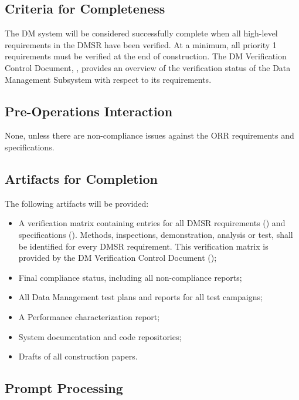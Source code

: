 \subsection{Criteria for Completeness} \label{sec:dm-completeness}
The DM system will be considered successfully complete when all high-level requirements in the DMSR have been verified. 
At a minimum, all priority 1 requirements must be verified at the end of construction.
The DM Verification Control Document, ,  provides an overview of the verification status of the Data Management Subsystem with respect to its requirements.

\subsection{Pre-Operations Interaction}
None, unless there are non-compliance issues against the ORR requirements and specifications.

\subsection{Artifacts for Completion} \label{sec:dm-artifacts}
The following artifacts will be provided:
\begin{itemize}
	\item A verification matrix containing entries for all DMSR requirements () and specifications (). Methods, inspections, demonstration, analysis or test, shall be identified for every DMSR requirement. This verification matrix is provided by the DM Verification Control Document ();
	\item Final compliance status, including all non-compliance reports;
	\item All Data Management test plans and reports for all test campaigns; 
	\item A Performance characterization report;
	\item System documentation and code repositories;
	\item Drafts of all construction papers. 
\end{itemize} 

\subsection{Prompt Processing}
 
